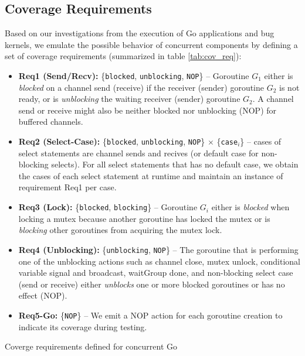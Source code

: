 \subsection{Coverage Requirements}
\label{sec:ch4_covreq}
Based on our investigations from the execution of Go applications and bug kernels, we emulate the possible behavior of concurrent components by defining a set of coverage requirements (summarized in table \ref{tab:cov_req}):
%
\begin{itemize}
  \item \textbf{Req1 (Send/Recv):} \{\texttt{blocked}, \texttt{unblocking}, \texttt{NOP}\} -- Goroutine $G_1$ either is \textit{blocked} on a channel send (receive) if the receiver (sender) goroutine $G_2$ is not ready, or is \textit{unblocking} the waiting receiver (sender) goroutine $G_2$. A channel send or receive might also be neither blocked nor unblocking (NOP) for buffered channels.
  \item \textbf{Req2 (Select-Case):} \{\texttt{blocked}, \texttt{unblocking}, \texttt{NOP}\} $\times$ \{\texttt{case}$_i$\} -- cases of select statements are channel sends and recives (or default case for non-blocking selects). For all select statements that has no default case, we obtain the cases of each select statement at runtime and maintain an instance of requirement Req1 per case.
  \item \textbf{Req3 (Lock):} \{\texttt{blocked}, \texttt{blocking}\} -- Goroutine $G_i$ either is \textit{blocked} when locking a mutex because another goroutine has locked the mutex or is \textit{blocking} other goroutines from acquiring the mutex lock.
  \item \textbf{Req4 (Unblocking):} \{\texttt{unblocking}, \texttt{NOP}\} -- The goroutine that is performing one of the unblocking actions such as channel close, mutex unlock, conditional variable signal and broadcast, waitGroup done, and non-blocking select case (send or receive) either \textit{unblocks} one or more blocked goroutines or has no effect (NOP).
  \item \textbf{Req5-Go:} \{\texttt{NOP}\} -- We emit a NOP action for each goroutine creation to indicate its coverage during testing.
\end{itemize}


\begin{table}[]
\centering
\caption{Coverge requirements defined for concurrent Go}
\scalebox{0.75}{

}
\label{tab:cov_req}
\end{table}

